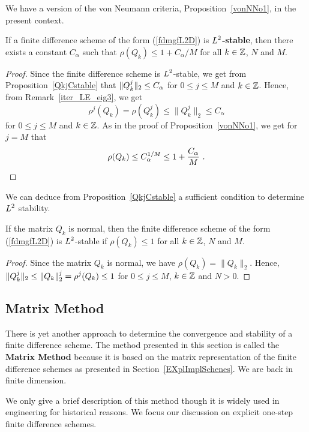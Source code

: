 We have a version of the von Neumann criteria,
Proposition~\ref{vonNNo1}, in the present context.

\begin{prop}
If a finite difference scheme of the form (\ref{fdmgfL2D}) is
{\bfseries $\displaystyle L^2$-stable}, then there exists a constant
$C_\alpha$ such that $\rho(Q_k) \leq 1 + C_\alpha/M$ for all
$k \in \mathbb{Z}$, $N$ and $M$.
\end{prop}

\begin{proof}
Since the finite difference scheme is $\displaystyle L^2$-stable, we get from
Proposition~\ref{QkjCstable} that
$\displaystyle \|Q_k^j\|_2 \leq C_\alpha$ for $0\leq j \leq M$ and $k \in \mathbb{Z}$.
Hence, from Remark~\ref{iter_LE_eig3}, we get
\[
  \rho^j(Q_k) = \rho(Q_k^j) \leq \|Q_k^j\|_2 \leq C_\alpha
\]
for $0\leq j \leq M$ and $k \in \mathbb{Z}$.  As in the proof of
Proposition~\ref{vonNNo1}, we get for $j=M$ that
\[
  \rho(Q_k) \leq C_\alpha^{1/M} \leq 1 + \frac{C_\alpha}{M} \ . \qedhere
\]
\end{proof}

We can deduce from Proposition~\ref{QkjCstable} a sufficient
condition to determine $\displaystyle L^2$ stability.

\begin{prop}
If the matrix $Q_k$ is normal, then the finite difference scheme of
the form (\ref{fdmgfL2D}) is $\displaystyle L^2$-stable if $\rho(Q_k) \leq 1$
for all $k \in \mathbb{Z}$, $N$ and $M$.
\end{prop}

\begin{proof}
Since the matrix $Q_k$ is normal, we have $\rho(Q_k) = \|Q_k\|_2$.  Hence,
$\displaystyle \|Q_k^j\|_2 \leq \|Q_k\|_2^j = \rho^j(Q_k) \leq 1$ for
$0\leq j \leq M$, $k \in \mathbb{Z}$ and $N>0$.
\end{proof}

\subsection{Matrix Method} \label{Moreell2Stab}

There is yet another approach to determine the convergence and stability
of a finite difference scheme.  The method presented in this section
is called the
{\bfseries Matrix Method}
because it is based on the matrix representation of the finite
difference schemes as presented in Section~\ref{EXplImplSchenes}.
We are back in finite dimension.

We only give a brief description of this method though it is widely
used in engineering for historical reasons.  We focus our discussion
on explicit one-step finite difference schemes. 


